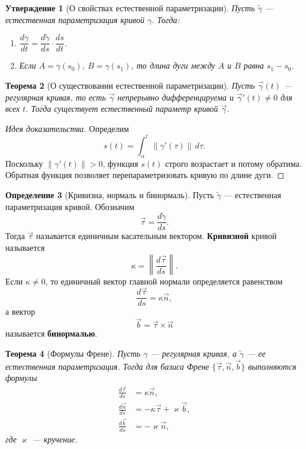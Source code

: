 \documentclass[12pt,a4paper]{article}
\newtheorem{theorem}{Теорема}[section]
\newtheorem{proposition}[theorem]{Утверждение}
\theoremstyle{definition}
\newtheorem{definition}[theorem]{Определение}
\begin{document}
\begin{proposition}[О свойствах естественной параметризации]
Пусть $\tilde{\gamma}$ --- естественная параметризация кривой $\gamma$. Тогда:
\begin{enumerate}
    \item $\dfrac{d\gamma}{dt} = \dfrac{d\tilde{\gamma}}{ds}\cdot \dfrac{ds}{dt}$.
    \item Если $A = \gamma(s_0)$, $B = \gamma(s_1)$, то длина дуги между $A$ и $B$ равна $s_1 - s_0$.
\end{enumerate}
\end{proposition}

\begin{theorem}[О существовании естественной параметризации]
Пусть $\vec{\gamma}(t)$ --- регулярная кривая, то есть $\vec{\gamma}$ непрерывно дифференцируема и $\vec{\gamma}'(t) \neq 0$ для всех $t$. Тогда существует естественный параметр кривой $\vec{\gamma}$.
\end{theorem}

\begin{proof}[Идея доказательства]
Определим
$$s(t) = \int_{\alpha}^{t} \|\gamma'(\tau)\|\,d\tau.$$
Поскольку $\|\gamma'(t)\| > 0$, функция $s(t)$ строго возрастает и потому обратима. Обратная функция позволяет перепараметризовать кривую по длине дуги.
\end{proof}

\begin{definition}[Кривизна, нормаль и бинормаль]
Пусть $\tilde{\gamma}$ --- естественная параметризация кривой. Обозначим
$$\vec{\tau} = \frac{d\tilde{\gamma}}{ds}.$$
Тогда $\vec{\tau}$ называется единичным касательным вектором. \textbf{Кривизной} кривой называется
$$\kappa = \left\| \frac{d\vec{\tau}}{ds} \right\|.$$
Если $\kappa \neq 0$, то единичный вектор главной нормали определяется равенством
$$\frac{d\vec{\tau}}{ds} = \kappa \vec{n},$$
а вектор
$$\vec{b} = \vec{\tau} \times \vec{n}$$
называется \textbf{бинормалью}.
\end{definition}

\begin{theorem}[Формулы Френе]
Пусть $\gamma$ --- регулярная кривая, а $\tilde{\gamma}$ --- ее естественная параметризация. Тогда для базиса Френе $\{\vec{\tau}, \vec{n}, \vec{b}\}$ выполняются формулы
\begin{align*}
    \frac{d\vec{\tau}}{ds} &= \kappa \vec{n}, \\
    \frac{d\vec{n}}{ds} &= -\kappa \vec{\tau} + \varkappa \vec{b}, \\
    \frac{d\vec{b}}{ds} &= -\varkappa \vec{n},
\end{align*}
где $\varkappa$ --- кручение.
\end{theorem}
\end{document}
